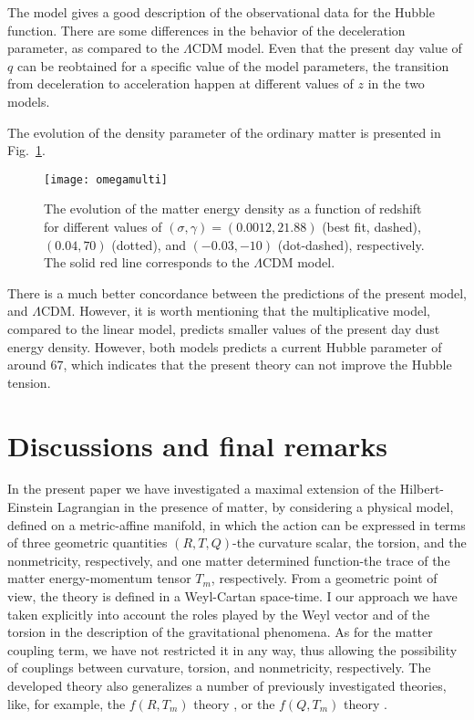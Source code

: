 \documentclass[aps,superscriptaddress, showpacs,preprintnumbers, superscriptaddress, nofootinbibt,twocolumn]{revtex4}
\begin{document}
The model gives a good description of the observational data for the Hubble function.  There are some differences in the behavior of the deceleration parameter, as compared to the $\Lambda$CDM model. Even that the present day value of $q$ can be reobtained for a specific value of the model parameters, the transition from deceleration to acceleration happen at different values of $z$ in the two models.

The evolution of the density parameter of the ordinary matter is presented in Fig.~\ref{fig2a}.

\begin{figure}
	\centering
	\texttt{[image: omegamulti]}
	\caption{The evolution of the matter energy density as a function of redshift for different values of $(\sigma,\gamma)=(0.0012,21.88)$ (best fit, dashed), $(0.04,70)$ (dotted), and $(-0.03,-10)$ (dot-dashed), respectively.  The solid red line corresponds to the $\Lambda$CDM model.}\label{fig2a}
\end{figure}

There is a much better concordance between the predictions of the present model, and $\Lambda$CDM. However, it is worth mentioning that the multiplicative model, compared to the linear model, predicts smaller values of the present day dust energy density. However, both models predicts a current Hubble parameter of around $67$, which indicates that the present theory can not improve the Hubble tension.
\\
\section{Discussions and final remarks}\label{sect4}

In the present paper we have investigated a maximal extension of the Hilbert-Einstein Lagrangian in the presence of matter, by considering a physical model, defined on a metric-affine manifold, in which the action can be expressed in terms of three geometric quantities $\left(R,T,Q\right)$-the curvature scalar, the torsion, and the nonmetricity, respectively, and one matter determined function-the trace of the matter energy-momentum tensor $T_m$, respectively. From a geometric point of view, the theory is defined in a Weyl-Cartan space-time. I our approach we have taken explicitly into account the roles played by the Weyl vector and of the torsion in the description of the gravitational phenomena. As for the matter coupling term, we have not restricted it in any way, thus allowing the possibility of couplings between curvature, torsion, and nonmetricity, respectively. The developed theory also generalizes a number of previously investigated theories, like, for example, the $f(R,T_m)$ theory  \cite{fT1}, or the $f(Q,T_m)$ theory \cite{fQC1, fQC2}.
\end{document}
